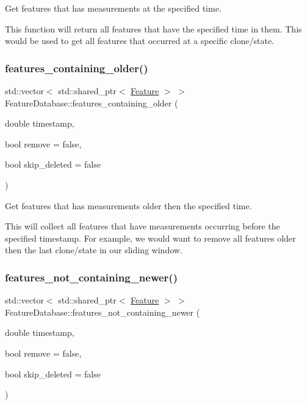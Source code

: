 Get features that has measurements at the specified time. 

This function will return all features that have the specified time in them. This would be used to get all features that occurred at a specific clone/state. \mbox{\label{classov__core_1_1FeatureDatabase_a5cdb62171c42c8787daec984a8cebe15}} 
\subsubsection{\texorpdfstring{features\+\_\+containing\+\_\+older()}{features\_containing\_older()}}
{\footnotesize\ttfamily std\+::vector$<$ std\+::shared\+\_\+ptr$<$ \hyperlink{classov__core_1_1Feature}{Feature} $>$ $>$ Feature\+Database\+::features\+\_\+containing\+\_\+older (\begin{DoxyParamCaption}\item[{double}]{timestamp,  }\item[{bool}]{remove = {\ttfamily false},  }\item[{bool}]{skip\+\_\+deleted = {\ttfamily false} }\end{DoxyParamCaption})}



Get features that has measurements older then the specified time. 

This will collect all features that have measurements occurring before the specified timestamp. For example, we would want to remove all features older then the last clone/state in our sliding window. \mbox{\label{classov__core_1_1FeatureDatabase_a4f6d8da846e81eac1faa3c7abd7f44a7}} 
\subsubsection{\texorpdfstring{features\+\_\+not\+\_\+containing\+\_\+newer()}{features\_not\_containing\_newer()}}
{\footnotesize\ttfamily std\+::vector$<$ std\+::shared\+\_\+ptr$<$ \hyperlink{classov__core_1_1Feature}{Feature} $>$ $>$ Feature\+Database\+::features\+\_\+not\+\_\+containing\+\_\+newer (\begin{DoxyParamCaption}\item[{double}]{timestamp,  }\item[{bool}]{remove = {\ttfamily false},  }\item[{bool}]{skip\+\_\+deleted = {\ttfamily false} }\end{DoxyParamCaption})}



